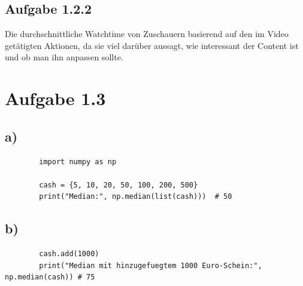 \documentclass[a4paper,12pt]{article}
\begin{document}
	\subsection*{Aufgabe 1.2.2}
	
	Die durchschnittliche Watchtime von Zuschauern basierend auf den im Video getätigten Aktionen, 
	da sie viel darüber aussagt, wie interessant der Content ist und ob man ihn anpassen sollte.
	
	\section*{Aufgabe 1.3}
	
	\subsection*{a)}
	
	\begin{lstlisting}
		import numpy as np
		
		cash = {5, 10, 20, 50, 100, 200, 500}
		print("Median:", np.median(list(cash)))  # 50
	\end{lstlisting}
	
	\subsection*{b)}
	
	\begin{lstlisting}
		cash.add(1000)
		print("Median mit hinzugefuegtem 1000 Euro-Schein:", np.median(cash)) # 75
	\end{lstlisting}
	
\end{document}
